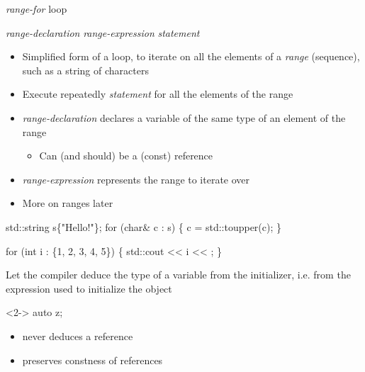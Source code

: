 \begin{frame}[fragile]{\textit{range-for} loop}

     \textit{range-declaration} \code{:} \textit{range-expression} \code{)} \textit{statement}

  \begin{itemize}
  \item Simplified form of a  loop, to iterate on all the elements of
    a \textit{range} (sequence), such as a string of characters
  \item<2-> Execute repeatedly \textit{statement} for all the elements of the range
  \item<3-> \textit{range-declaration} declares a variable of the same type of
    an element of the range
    \begin{itemize}
    \item Can (and should) be a (const) reference
    \end{itemize}
  \item<4-> \textit{range-expression} represents the range to iterate over
  \item<5-> More on ranges later
  \end{itemize}

  \begin{codeblock}
std::string s\{"Hello!"\};
for (char& c : s) \{
  c = std::toupper(c); 
\}

for (int i : \{1, 2, 3, 4, 5\}) \{
  std::cout << i << \upquote{ };
\}\end{codeblock}

\end{frame}

\begin{frame}[fragile]{}

  Let the compiler deduce the type of a variable from the initializer, i.e. from
  the expression used to initialize the object

  \begin{codeblock}<2->{
auto z;                       }\end{codeblock}

  \begin{itemize}
  \item<10->  never deduces a reference
  \item<11->  preserves constness of references
  \end{itemize}
\end{frame}

